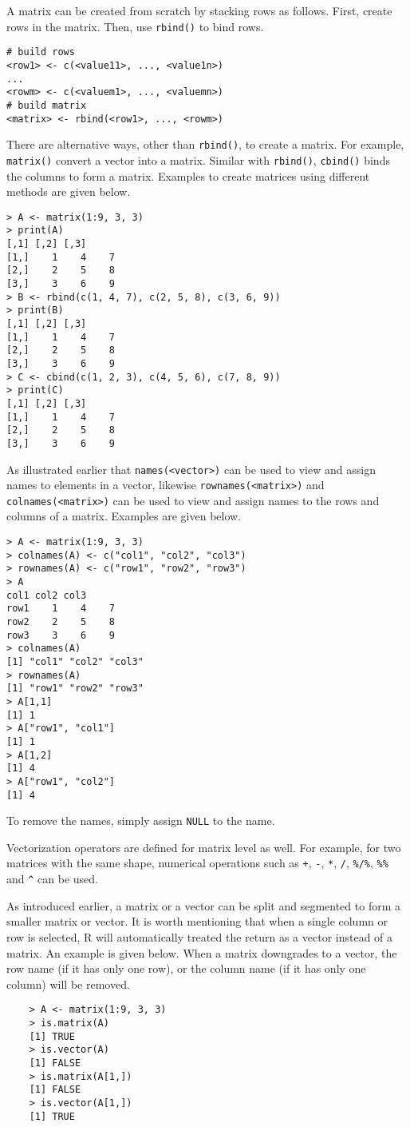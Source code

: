 A matrix can be created from scratch by stacking rows as follows. First, create rows in the matrix. Then, use \verb|rbind()| to bind rows.
\begin{lstlisting}
# build rows
<row1> <- c(<value11>, ..., <value1n>)
...
<rowm> <- c(<valuem1>, ..., <valuemn>)
# build matrix
<matrix> <- rbind(<row1>, ..., <rowm>)
\end{lstlisting}

There are alternative ways, other than \verb|rbind()|, to create a matrix. For example, \verb|matrix()| convert a vector into a matrix. Similar with \verb|rbind()|, \verb|cbind()| binds the columns to form a matrix. Examples to create matrices using different methods are given below.
\begin{lstlisting}
> A <- matrix(1:9, 3, 3)
> print(A)
[,1] [,2] [,3]
[1,]    1    4    7
[2,]    2    5    8
[3,]    3    6    9
> B <- rbind(c(1, 4, 7), c(2, 5, 8), c(3, 6, 9))
> print(B)
[,1] [,2] [,3]
[1,]    1    4    7
[2,]    2    5    8
[3,]    3    6    9
> C <- cbind(c(1, 2, 3), c(4, 5, 6), c(7, 8, 9))
> print(C)
[,1] [,2] [,3]
[1,]    1    4    7
[2,]    2    5    8
[3,]    3    6    9
\end{lstlisting}

As illustrated earlier that \verb|names(<vector>)| can be used to view and assign names to elements in a vector, likewise \verb|rownames(<matrix>)| and \verb|colnames(<matrix>)| can be used to view and assign names to the rows and columns of a matrix. Examples are given below.
\begin{lstlisting}
> A <- matrix(1:9, 3, 3)
> colnames(A) <- c("col1", "col2", "col3")
> rownames(A) <- c("row1", "row2", "row3")
> A
col1 col2 col3
row1    1    4    7
row2    2    5    8
row3    3    6    9
> colnames(A)
[1] "col1" "col2" "col3"
> rownames(A)
[1] "row1" "row2" "row3"
> A[1,1]
[1] 1
> A["row1", "col1"]
[1] 1
> A[1,2]
[1] 4
> A["row1", "col2"]
[1] 4
\end{lstlisting}
To remove the names, simply assign \verb|NULL| to the name.

Vectorization operators are defined for matrix level as well. For example, for two matrices with the same shape, numerical operations such as  \verb|+|, \verb|-|, \verb|*|, \verb|/|, \verb|%/%|, \verb|%%| and \verb|^| can be used.

As introduced earlier, a matrix or a vector can be split and segmented to form a smaller matrix or vector. It is worth mentioning that when a single column or row is selected, R will automatically treated the return as a vector instead of a matrix. An example is given below. When a matrix downgrades to a vector, the row name (if it has only one row), or the column name (if it has only one column) will be removed.
\begin{lstlisting}
	> A <- matrix(1:9, 3, 3)
	> is.matrix(A)
	[1] TRUE
	> is.vector(A)
	[1] FALSE
	> is.matrix(A[1,])
	[1] FALSE
	> is.vector(A[1,])
	[1] TRUE
\end{lstlisting}

